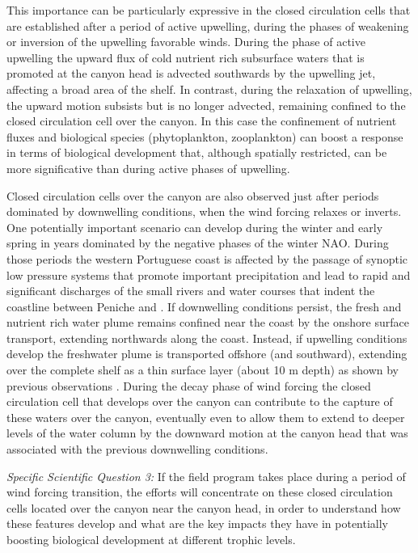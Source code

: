 \begin{description}
This importance can be particularly expressive in the closed
circulation cells that are established after a period of active
upwelling, during the phases of weakening or inversion of the
upwelling favorable winds. During the phase of active upwelling the
upward flux of cold nutrient rich subsurface waters that is
promoted at the canyon head is advected southwards by the upwelling
jet, affecting a broad area of the shelf. In contrast, during the
relaxation of upwelling, the upward motion subsists but is no longer
advected, remaining confined to the closed circulation cell over the
canyon. In this case the confinement of nutrient fluxes and biological
species (phytoplankton, zooplankton) can boost a response in terms of
biological development that, although spatially restricted, can be
more significative than during active phases of upwelling.

Closed circulation cells over the canyon are also observed just after
periods dominated by downwelling conditions, when the wind forcing
relaxes or inverts. One potentially important scenario can develop
during the winter and early spring in years dominated by the negative
phases of the winter NAO. During those periods the western Portuguese
coast is affected by the passage of synoptic low pressure systems that
promote important precipitation and lead to rapid and significant
discharges of the small rivers and water courses that indent the
coastline between Peniche and \naze.  If downwelling conditions
persist, the fresh and nutrient rich water plume remains confined near
the coast by the onshore surface transport, extending northwards along
the coast. Instead, if upwelling conditions develop the freshwater
plume is transported offshore (and southward), extending over the
complete shelf as a thin surface layer (about 10 m depth) as shown by
previous observations . During the decay phase of wind
forcing the closed circulation cell that develops over the canyon can
contribute to the capture of these waters over the canyon, eventually
even to allow them to extend to deeper levels of the water column by
the downward motion at the canyon head that was associated with the
previous downwelling conditions. 

\textsl{Specific Scientific Question 3:} If the \proj field program
takes place during a period of wind forcing transition, the efforts
will concentrate on these closed circulation cells located over the
canyon near the canyon head, in order to understand how these features
develop and what are the key impacts they have in potentially boosting
biological development at different trophic levels.


\end{description}
